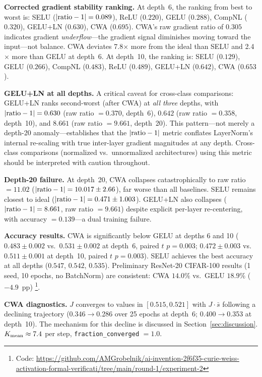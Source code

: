 \documentclass[11pt,twocolumn,letterpaper]{article}
\begin{document}
\textbf{Corrected gradient stability ranking.} At depth~6, the ranking from best to worst is: SELU
($|{\rm ratio}-1| = 0.089$), ReLU ($0.220$), GELU ($0.288$), CompNL ($0.320$), GELU+LN ($0.630$), CWA ($0.695$). CWA's
raw gradient ratio of $0.305$ indicates gradient \emph{underflow}---the gradient signal diminishes moving toward the
input---not balance. CWA deviates 7.8$\times$ more from the ideal than SELU and 2.4$\times$ more than GELU at depth~6.
At depth~10, the ranking is: SELU ($0.129$), GELU ($0.266$), CompNL ($0.483$), ReLU ($0.489$), GELU+LN ($0.642$), CWA
($0.653$).

\textbf{GELU+LN at all depths.} A critical caveat for cross-class comparisons: GELU+LN ranks second-worst (after CWA) at
\emph{all three} depths, with $|{\rm ratio}-1| = 0.630$ (raw ratio $= 0.370$, depth~6), $0.642$ (raw ratio $= 0.358$,
depth~10), and $8.661$ (raw ratio $= 9.661$, depth~20). This pattern---not merely a depth-20 anomaly---establishes that
the $|{\rm ratio}-1|$ metric conflates LayerNorm's internal re-scaling with true inter-layer gradient magnitudes at any
depth. Cross-class comparisons (normalized vs.\ unnormalized architectures) using this metric should be interpreted with
caution throughout.

\textbf{Depth-20 failure.} At depth~20, CWA collapses catastrophically to raw ratio $= 11.02$
($|{\rm ratio}-1| = 10.017 \pm 2.66$), far worse than all baselines. SELU remains closest to ideal
($|{\rm ratio}-1| = 0.471 \pm 1.003$). GELU+LN also collapses ($|{\rm ratio}-1| = 8.661$, raw ratio $= 9.661$) despite
explicit per-layer re-centering, with accuracy $= 0.139$---a dual training failure.

\textbf{Accuracy results.} CWA is significantly below GELU at depths 6 and 10 ($0.483 \pm 0.002$ vs.\ $0.531 \pm 0.002$
at depth~6, paired $t$ $p = 0.003$; $0.472 \pm 0.003$ vs.\ $0.511 \pm 0.001$ at depth~10, paired $t$ $p = 0.003$).
SELU achieves the best accuracy at all depths ($0.547$, $0.542$, $0.535$). Preliminary ResNet-20 CIFAR-100 results
(1 seed, 10 epochs, no BatchNorm) are consistent: CWA $14.0\%$ vs.\ GELU $18.9\%$ ($-4.9$~pp)
\footnote{Code: \url{https://github.com/AMGrobelnik/ai-invention-2f6f35-curie-weiss-activation-formal-verificati/tree/main/round-1/experiment-2}}.

\textbf{CWA diagnostics.} $J$ converges to values in $[0.515, 0.521]$ with $J\cdot\bar{s}$ following a declining
trajectory (0.346$\to$0.286 over 25 epochs at depth~6; 0.400$\to$0.353 at depth~10). The mechanism for this decline is
discussed in Section~\ref{sec:discussion}. $K_{\rm mean} \approx 7.4$ per step, \texttt{fraction\_converged} $= 1.0$.
\end{document}
